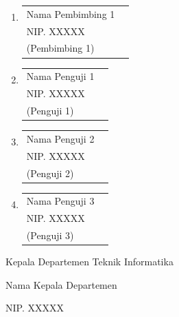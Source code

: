 \vspace{0.1cm}

{\fontsize{12pt}{14pt}\selectfont
\begin{enumerate}[itemsep=0.08cm, topsep=0pt, parsep=0pt]
    \item \begin{tabular}[t]{@{}p{8.5cm}p{4.5cm}@{}}
        Nama Pembimbing 1 & \dotfill \\[-0.15cm]
        NIP. XXXXX & \\[-0.15cm]
        (Pembimbing 1) &
    \end{tabular}
    
    \item \begin{tabular}[t]{@{}p{8.5cm}p{4.5cm}@{}}
        Nama Penguji 1 & \dotfill \\[-0.15cm]
        NIP. XXXXX & \\[-0.15cm]
        (Penguji 1) &
    \end{tabular}
    
    \item \begin{tabular}[t]{@{}p{8.5cm}p{4.5cm}@{}}
        Nama Penguji 2 & \dotfill \\[-0.15cm]
        NIP. XXXXX & \\[-0.15cm]
        (Penguji 2) &
    \end{tabular}
    
    \item \begin{tabular}[t]{@{}p{8.5cm}p{4.5cm}@{}}
        Nama Penguji 3 & \dotfill \\[-0.15cm]
        NIP. XXXXX & \\[-0.15cm]
        (Penguji 3) &
    \end{tabular}
\end{enumerate}
}

\vspace{0.3cm}

{\fontsize{12pt}{14pt}\selectfont
\noindent\hspace{0.5cm}Kepala Departemen Teknik Informatika

\vspace{0.6cm}

\noindent\hspace{0.5cm}Nama Kepala Departemen

\noindent\hspace{0.5cm}NIP. XXXXX
}